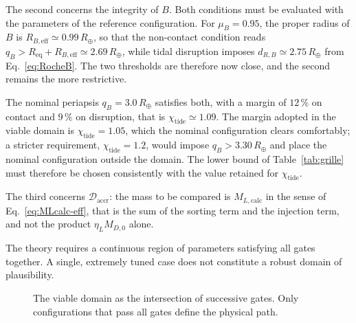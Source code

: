 \documentclass[11pt,a4paper,openany]{report}
\newcommand{\Rt}{R_{\oplus}}
\newcommand{\Req}{R_{\mathrm{eq}}}
\begin{document}
The second concerns the integrity of $B$. Both conditions must be evaluated with the parameters of
the reference configuration. For $\mu_B=0.95$, the proper radius of $B$ is
$R_{B,\mathrm{eff}}\simeq0.99\,\Rt$, so that the non-contact condition reads
$q_B>\Req+R_{B,\mathrm{eff}}\simeq2.69\,\Rt$, while tidal disruption imposes
$d_{R,B}\simeq2.75\,\Rt$ from Eq.~\eqref{eq:RocheB}. The two thresholds are therefore now close, and
the second remains the more restrictive.

The nominal periapsis $q_B=3.0\,\Rt$ satisfies both, with a margin of $12\,\%$ on contact and
$9\,\%$ on disruption, that is $\chi_{\mathrm{tide}}\simeq1.09$. The margin adopted in the viable
domain is $\chi_{\mathrm{tide}}=1.05$, which the nominal configuration clears comfortably; a
stricter requirement, $\chi_{\mathrm{tide}}=1.2$, would impose $q_B>3.30\,\Rt$ and place the
nominal configuration outside the domain. The lower bound of Table~\ref{tab:grille} must therefore
be chosen consistently with the value retained for $\chi_{\mathrm{tide}}$.

The third concerns $\mathcal{D}_{\mathrm{accr}}$: the mass to be compared is $M_{L,\mathrm{calc}}$
in the sense of Eq.~\eqref{eq:MLcalc-eff}, that is the sum of the sorting term and the injection
term, and not the product $\eta_L M_{D,0}$ alone.

\begin{falsif}
The theory requires a continuous region of parameters satisfying all gates together. A single,
extremely tuned case does not constitute a robust domain of plausibility.
\end{falsif}


\begin{figure}[htbp]
\centering
{}
\caption{The viable domain as the intersection of successive gates. Only configurations that pass
all gates define the physical path.}
\label{fig:portes}
\end{figure}
\end{document}
